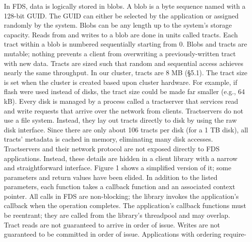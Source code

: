 In FDS, data is logically stored in blobs. A blob is a
byte sequence named with a 128-bit GUID. The GUID
can either be selected by the application or assigned randomly by the system. Blobs can be any length up to the
system’s storage capacity. Reads from and writes to a
blob are done in units called tracts. Each tract within a
blob is numbered sequentially starting from 0. Blobs and
tracts are mutable; nothing prevents a client from overwriting a previously-written tract with new data.
Tracts are sized such that random and sequential access achieves nearly the same throughput. In our cluster,
tracts are 8 MB (§5.1). The tract size is set when the cluster is created based upon cluster hardware. For example,
if flash were used instead of disks, the tract size could be
made far smaller (e.g., 64 kB).
Every disk is managed by a process called a tractserver that services read and write requests that arrive
over the network from clients. Tractservers do not use a
file system. Instead, they lay out tracts directly to disk by
using the raw disk interface. Since there are only about
106 tracts per disk (for a 1 TB disk), all tracts’ metadata
is cached in memory, eliminating many disk accesses.
Tractservers and their network protocol are not exposed directly to FDS applications. Instead, these details
are hidden in a client library with a narrow and straightforward interface. Figure 1 shows a simplified version of
it; some parameters and return values have been elided.
In addition to the listed parameters, each function takes a
callback function and an associated context pointer. All
calls in FDS are non-blocking; the library invokes the
application’s callback when the operation completes.
The application’s callback functions must be reentrant; they are called from the library’s threadpool and
may overlap. Tract reads are not guaranteed to arrive in
order of issue. Writes are not guaranteed to be committed in order of issue. Applications with ordering require-

